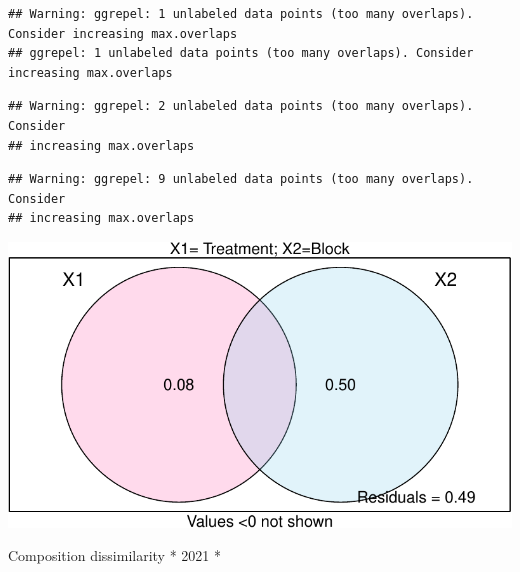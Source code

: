 \documentclass[
]{article}
\begin{document}
\begin{verbatim}
## Warning: ggrepel: 1 unlabeled data points (too many overlaps). Consider increasing max.overlaps
## ggrepel: 1 unlabeled data points (too many overlaps). Consider increasing max.overlaps
\end{verbatim}

\begin{verbatim}
## Warning: ggrepel: 2 unlabeled data points (too many overlaps). Consider
## increasing max.overlaps
\end{verbatim}

\begin{verbatim}
## Warning: ggrepel: 9 unlabeled data points (too many overlaps). Consider
## increasing max.overlaps
\end{verbatim}

\includegraphics{log-project-aubrie-winnie_files/figure-latex/unnamed-chunk-4-2.pdf}

Composition dissimilarity * 2021 *
\end{document}
